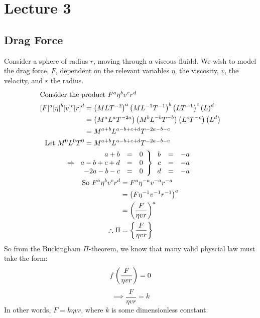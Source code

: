 \documentclass{report}
\begin{document}
\pagebreak
\section{Lecture 3}
\subsection*{Drag Force}
Consider a sphere of radius $r$, moving through a viscous fluidd. We wish to model the drag force, $F$, dependent on the relevant variables $\eta$, the viscosity, $v$, the velocity, and $r$ the radius.
\begin{gather*}
	\intertext{Consider the product $F^a\eta^bv^cr^d$} 
	\begin{aligned}
		[F]^a[\eta]^b[v]^c[r]^d &= \bracks{MLT^{-2}}^a\bracks{ML^{-1} T^{-1}}^b\bracks{LT^{-1}}^c\bracks{L}^d \\
			&= \bracks{M^aL^aT^{-2a}}\bracks{M^bL^{-b}T^{-b}}\bracks{L^cT^{-c}}\bracks{L^d} \\
			&= M^{a+b}L^{a-b+c+d}T^{-2a-b-c} \\
		\Let M^0L^0T^0 &= M^{a+b}L^{a-b+c+d}T^{-2a-b-c}
	\end{aligned}\\
	\Rightarrow \left.\begin{array}{rcc}
		a + b & = & 0 \\
		a - b + c + d & = & 0 \\
		-2a - b - c & = & 0
	\end{array}\right\rbrace \begin{array}{ccl}
		b & = & -a \\
		c & = & -a \\
 		d & = & -a
	\end{array} \\
	\begin{aligned}
		\So F^a\eta^bv^cr^d &= F^a\eta^{-a}v^{-a}r^{-a} \\
			&= \bracks{F\eta^{-1}v^{-1}r^{-1}}^{a} \\
			&= \bracks{\frac{F}{\eta v r }}^{a} \\
		\tf \Pi &= \braces{\frac{F}{\eta v r }}
	\end{aligned}
\end{gather*}
So from the Buckingham $\Pi$-theorem, we know that many valid physcial law must take the form:
$$
	f\left( \frac{F}{\eta vr} \right) = 0
$$
$$
	\implies \frac{F}{\eta vr} = k
$$
In other words, $F = k\eta vr$, where $k$ is some dimensionless constant.

\end{document}
